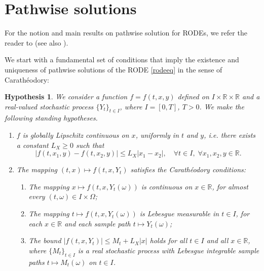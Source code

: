 \documentclass[reqno,12pt]{amsart}
\theoremstyle{plain}%
\newtheorem{stdhyp}{Hypothesis}[section]
\theoremstyle{definition}
\begin{document}
\section{Pathwise solutions}
\label{secpathwisesolution}

For the notion and main results on pathwise solution for RODEs, we refer the reader to \cite[Section 2.1]{HanKloeden2017} (see also \cite[Section 3.3]{NeckelRupp2013}).

We start with a fundamental set of conditions that imply the existence and uniqueness of pathwise solutions of the RODE \eqref{rodeeq} in the sense of Carath\'eodory:

\begin{stdhyp}
    \label{standinghypotheses1}
    We consider a function $f=f(t, x, y)$ defined on $I\times \mathbb{R}\times\mathbb{R}$ and a real-valued stochastic process $\{Y_t\}_{t\in I}$, where $I=[0, T]$, $T > 0$. We make the following standing hypotheses.
    \begin{enumerate}
        \item \label{standinghypotheses1Lx} $f$ is globally Lipschitz continuous on $x$, uniformly in $t$ and $y$, i.e. there exists a constant $L_X \geq 0$ such that
            \begin{equation}
                \label{Lxassumptionbasic}
                |f(t, x_1, y) - f(t, x_2, y)| \leq L_X |x_1 - x_2|, \quad \forall t \in I, \;\forall x_1, x_2, y\in\mathbb{R}.
            \end{equation}

        \item \label{standinghypotheses1Car} The mapping $(t, x) \mapsto f(t, x, Y_t)$ satisfies the Carath\'eodory conditions:
            \begin{enumerate}
                \item The mapping $x \mapsto f(t, x, Y_t(\omega))$ is continuous on $x\in \mathbb{R}$, for almost every $(t, \omega)\in I\times \Omega$;
                \item The mapping $t \mapsto f(t, x, Y_t(\omega))$ is Lebesgue measurable in $t\in I$, for each $x\in \mathbb{R}$ and each sample path $t \mapsto Y_t(\omega)$;
                \item \label{standinghypotheses1Carboundonf} The bound $|f(t, x, Y_t)| \leq M_t + L_X|x|$ holds for all $t\in I$ and all $x\in\mathbb{R}$, where $\{M_t\}_{t\in I}$ is a real stochastic process with Lebesgue integrable sample paths $t\mapsto M_t(\omega)$ on $t\in I$.
            \end{enumerate}
    \end{enumerate}
\end{stdhyp}
\end{document}
